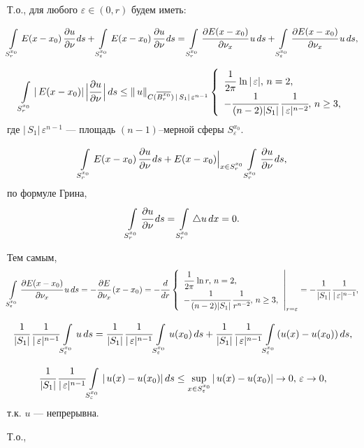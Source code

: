 \documentclass[12pt,a4paper,draft]{article}
\DeclareRobustCommand*{\т}{~--- }
\DeclareRobustCommand*{\ч}{~-- }
\begin{document}
Т.о., для любого $\varepsilon\in(0,r)$ будем иметь:

$$\int\limits_{S_r^{x_0}} E(x-x_0)\,\cfrac{\partial
u}{\partial\nu}\,ds+ \int\limits_{S_{\varepsilon}^{x_0}}
E(x-x_0)\,\cfrac{\partial u}{\partial\nu}\,ds=
\int\limits_{S_r^{x_0}} \cfrac{\partial
E(x-x_0)}{\partial\nu_x}\,u\,ds+
\int\limits_{S_{\varepsilon}^{x_0}} \cfrac{\partial
E(x-x_0)}{\partial\nu_x}\,u\,ds,$$

$$\int\limits_{S_r^{x_0}} |\,E(x-x_0)|\,\Bigl|\cfrac{\partial
u}{\partial\nu}\,\Bigr|\,ds\le
\|\,u\|_{C(\overline{B_r^{x_0}})\,|\,S_1|\,\varepsilon^{n-1}}
\left\{%
\begin{array}{ll}
    \cfrac1{2\pi}\,\ln|\,\varepsilon|,\,n=2,      \\
    -\cfrac1{(n-2)|S_1|}\,\cfrac1{|\,\varepsilon|^{n-2}},\,n\ge3, \\
\end{array}%
\right.$$ где $|\,S_1|\,\varepsilon^{n-1}$ --- площадь
$(n-1)$--мерной сферы $S_{\varepsilon}^{x_0}.$

$$\int\limits_{S_r^{x_0}} E(x-x_0)\,\cfrac{\partial
u}{\partial\nu}\,ds+ \Bigl.E(x-x_0) \Bigr|_{x\in S_{r}^{x_0}}
\int\limits_{S_r^{x_0}}\cfrac{\partial u}{\partial\nu}\,ds,$$ по
формуле Грина,
$$\int\limits_{S_r^{x_0}}\cfrac{\partial u}{\partial\nu}\,ds=
\int\limits_{S_r^{x_0}}\triangle u\,dx=0.$$

Тем самым,
$$\int\limits_{S_{\varepsilon}^{x_0}} \cfrac{\partial
E(x-x_0)}{\partial\nu_x}\,u\,ds=-\cfrac{\partial
E}{\partial\nu_x}\,(x-x_0)=-\cfrac d{dr} \left.
\left\{%
\begin{array}{ll}
    \cfrac1{2\pi}\,\ln r,\,n=2,      \\
    -\cfrac1{(n-2)|S_1|}\,\cfrac1{ r^{n-2}},\,n\ge3, \\
\end{array}%
\right.\right|_{r=\varepsilon}=
-\cfrac1{|S_1|}\,\cfrac1{|\,\varepsilon|^{n-1}},$$

$$\cfrac1{|S_1|}\,\cfrac1{|\,\varepsilon|^{n-1}}
\int\limits_{S_{\varepsilon}^{x_0}} u\,ds=
\cfrac1{|S_1|}\,\cfrac1{|\,\varepsilon|^{n-1}}
\int\limits_{S_{\varepsilon}^{x_0}} u(x_0)\,ds+
\cfrac1{|S_1|}\,\cfrac1{|\,\varepsilon|^{n-1}}
\int\limits_{S_{\varepsilon}^{x_0}} (u(x)-u(x_0))\,ds,$$

$$\cfrac1{|S_1|}\,\cfrac1{|\,\varepsilon|^{n-1}}
\int\limits_{S_{\varepsilon}^{x_0}} |\,u(x)-u(x_0)|\,ds\le
\sup_{x\in
S_{\varepsilon}^{x_0}}|\,u(x)-u(x_0)|\to0,\,\varepsilon\to0,$$
т.к. $u$ --- непрерывна.

Т.о.,
\end{document}
